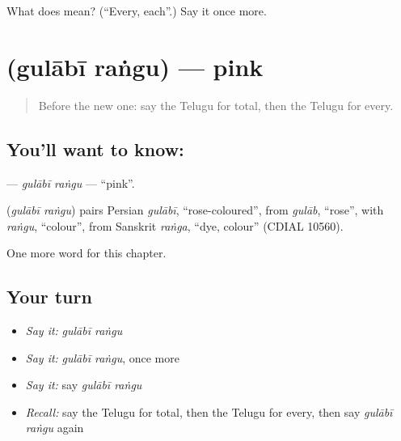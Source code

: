 \begin{tcolorbox}[breakable,colback=teal!4,colframe=teal!35!black,title={Before you move on}]
What does  mean? (\textquotedblleft{}Every, each\textquotedblright{}.) Say it once more.
\end{tcolorbox}
\section[\texorpdfstring{\te{గులాబీ} \te{రంగు} (gulābī raṅgu)}{గులాబీ రంగు (gulābī raṅgu)}]{  (gulābī raṅgu) — pink}

\label{lesson:TE-C180-gulabi-rangu}



\begin{quote}
Before the new one: say the Telugu for total, then the Telugu for every.
\end{quote}

\subsection*{You'll want to know:  }
\textbf{ } — \emph{gulābī raṅgu} — \textquotedblleft{}pink\textquotedblright{}.

\begin{cousinweb}
\textbf{ } (\emph{gulābī raṅgu}) pairs Persian \emph{gulābī}, \textquotedblleft{}rose-coloured\textquotedblright{}, from \emph{gulāb}, \textquotedblleft{}rose\textquotedblright{}, with \emph{raṅgu}, \textquotedblleft{}colour\textquotedblright{}, from Sanskrit \emph{raṅga}, \textquotedblleft{}dye, colour\textquotedblright{} (CDIAL 10560).
\end{cousinweb}

\begin{grammarlens}[title={What you've built}]
One more word for this chapter.
\end{grammarlens}

\subsection*{Your turn}
\begin{itemize}
\raggedright
  \item \emph{Say it:} \emph{gulābī raṅgu}
  \item \emph{Say it:} \emph{gulābī raṅgu}, once more
  \item \emph{Say it:} say \emph{gulābī raṅgu}
  \item \emph{Recall:} say the Telugu for total, then the Telugu for every, then say \emph{gulābī raṅgu} again
\end{itemize}

